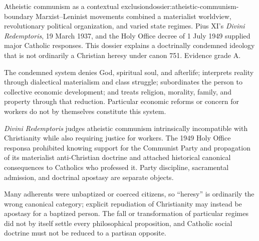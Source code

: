 \begin{heresydossier}{Atheistic communism as a contextual exclusion}{dossier:atheistic-communism-boundary}
\objectfield Marxist--Leninist movements combined a materialist worldview, revolutionary political organization, and varied state regimes. Pius XI's \emph{Divini Redemptoris}, 19 March 1937, and the Holy Office decree of 1 July 1949 supplied major Catholic responses. This dossier explains a doctrinally condemned ideology that is not ordinarily a Christian heresy under canon 751. Evidence grade A.

\propositionfield The condemned system denies God, spiritual soul, and afterlife; interprets reality through dialectical materialism and class struggle; subordinates the person to collective economic development; and treats religion, morality, family, and property through that reduction. Particular economic reforms or concern for workers do not by themselves constitute this system.

\responsefield \emph{Divini Redemptoris} judges atheistic communism intrinsically incompatible with Christianity while also requiring justice for workers. The 1949 Holy Office responsa prohibited knowing support for the Communist Party and propagation of its materialist anti-Christian doctrine and attached historical canonical consequences to Catholics who professed it. Party discipline, sacramental admission, and doctrinal apostasy are separate objects.

\aftermathfield Many adherents were unbaptized or coerced citizens, so ``heresy'' is ordinarily the wrong canonical category; explicit repudiation of Christianity may instead be apostasy for a baptized person. The fall or transformation of particular regimes did not by itself settle every philosophical proposition, and Catholic social doctrine must not be reduced to a partisan opposite.
\end{heresydossier}

